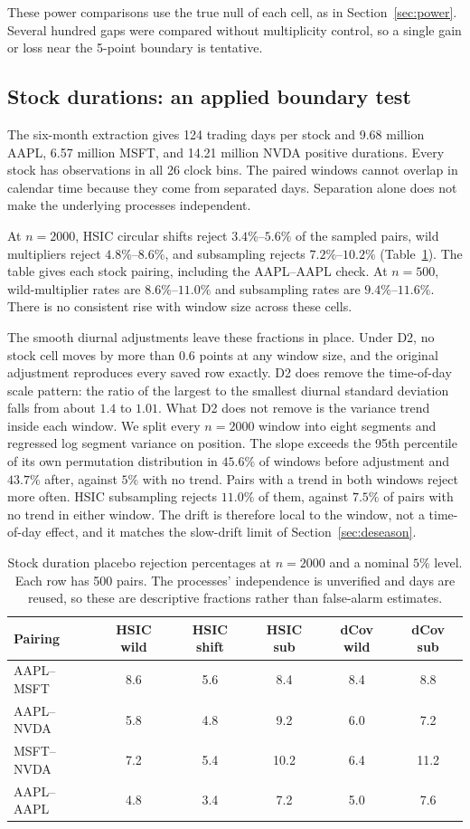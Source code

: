 \documentclass[11pt]{article}
\theoremstyle{remark}
\begin{document}
These power comparisons use the true null of each cell, as in Section~\ref{sec:power}. Several hundred gaps were compared without multiplicity control, so a single gain or loss near the 5-point boundary is tentative.

\subsection{Stock durations: an applied boundary test}\label{sec:real}
The six-month extraction gives 124 trading days per stock and 9.68 million AAPL, 6.57 million MSFT, and 14.21 million NVDA positive durations. Every stock has observations in all 26 clock bins. The paired windows cannot overlap in calendar time because they come from separated days. Separation alone does not make the underlying processes independent.

At $n=2000$, HSIC circular shifts reject $3.4\%$--$5.6\%$ of the sampled pairs, wild multipliers reject $4.8\%$--$8.6\%$, and subsampling rejects $7.2\%$--$10.2\%$ (Table~\ref{tab:stock}). The table gives each stock pairing, including the AAPL--AAPL check. At $n=500$, wild-multiplier rates are $8.6\%$--$11.0\%$ and subsampling rates are $9.4\%$--$11.6\%$. There is no consistent rise with window size across these cells.

The smooth diurnal adjustments leave these fractions in place. Under D2, no stock cell moves by more than $0.6$ points at any window size, and the original adjustment reproduces every saved row exactly. D2 does remove the time-of-day scale pattern: the ratio of the largest to the smallest diurnal standard deviation falls from about $1.4$ to $1.01$. What D2 does not remove is the variance trend inside each window. We split every $n=2000$ window into eight segments and regressed log segment variance on position. The slope exceeds the 95th percentile of its own permutation distribution in $45.6\%$ of windows before adjustment and $43.7\%$ after, against $5\%$ with no trend. Pairs with a trend in both windows reject more often. HSIC subsampling rejects $11.0\%$ of them, against $7.5\%$ of pairs with no trend in either window. The drift is therefore local to the window, not a time-of-day effect, and it matches the slow-drift limit of Section~\ref{sec:deseason}.

\begin{table}[H]
\centering\small
\caption{Stock duration placebo rejection percentages at $n=2000$ and a nominal $5\%$ level. Each row has 500 pairs. The processes' independence is unverified and days are reused, so these are descriptive fractions rather than false-alarm estimates.}\label{tab:stock}
\begin{tabular}{@{}lccccc@{}}
\toprule
Pairing & HSIC wild & HSIC shift & HSIC sub & dCov wild & dCov sub \\
\midrule
AAPL--MSFT & 8.6 & 5.6 & 8.4 & 8.4 & 8.8 \\
AAPL--NVDA & 5.8 & 4.8 & 9.2 & 6.0 & 7.2 \\
MSFT--NVDA & 7.2 & 5.4 & 10.2 & 6.4 & 11.2 \\
AAPL--AAPL & 4.8 & 3.4 & 7.2 & 5.0 & 7.6 \\
\bottomrule
\end{tabular}
\end{table}
\end{document}
